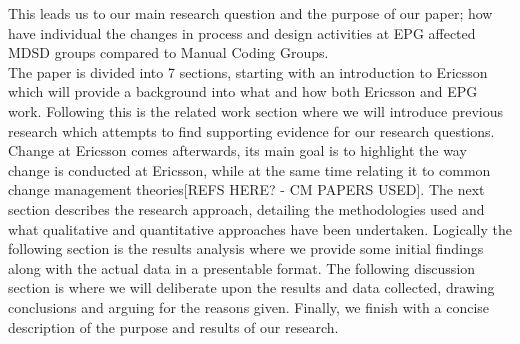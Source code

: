 \documentclass[fina_report_innit.tex]{subfiles}
\begin{document}
This leads us to our main research question and the purpose of our paper; how have individual the changes in process and design activities at EPG affected MDSD groups compared to Manual Coding Groups.
\\

The paper is divided into 7 sections, starting with an introduction to Ericsson which will provide a background into what and how both Ericsson and EPG work. Following this is the related work section where we will introduce previous research which attempts to find supporting evidence for our research questions. Change at Ericsson comes afterwards, its main goal is to highlight the way change is conducted at Ericsson, while at the same time relating it to common change management theories[REFS HERE? - CM PAPERS USED]. The next section describes the research approach, detailing the methodologies used and what qualitative and quantitative approaches have been undertaken. Logically the following section is the results analysis where we provide some initial findings along with the actual data in a presentable format. The following discussion section is where we will deliberate upon the results and data collected, drawing conclusions and arguing for the reasons given. Finally, we finish with a concise description of the purpose and results of our research.
\end{document}
